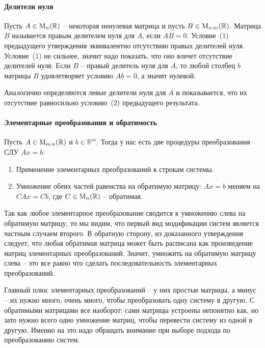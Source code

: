 \paragraph{Делители нуля}

Пусть $A\in\operatorname{M}_{n}(\mathbb R)$ -- некоторая ненулевая матрица и пусть $B\in\operatorname{M}_{n\,m}(\mathbb R)$.
Матрица $B$ называется правым делителем нуля для $A$, если $AB = 0$.
Условие~(1) предыдущего утверждения эквивалентно отсутствию правых делителей нуля.
Условие~(1) не сильнее, значит надо показать, что оно влечет отсутствие делителей нуля.
Если $B$ -- правый делитель нуля для $A$, то любой столбец $b$ матрицы $B$ удовлетворяет условию $Ab = 0$, а значит нулевой.

Аналогично определяются левые делители нуля для $A$ и показывается, что их отсутствие равносильно условию~(2) предыдущего результата.

\paragraph{Элементарные преобразования и обратимость}

Пусть $A\in\operatorname{M}_{m\,n}(\mathbb R)$ и $b\in\mathbb R^m$.
Тогда у нас есть две процедуры преобразования СЛУ $Ax = b$:
\begin{enumerate}
\item Применение элементарных преобразований к строкам системы.

\item Умножение обеих частей равенства на обратимую матрицу: $Ax=b$ меняем на $CAx = Cb$, где $C\in\operatorname{M}_{n}(\mathbb R)$ -- обратимая.
\end{enumerate}

Так как любое элементарное преобразование сводится к умножению слева на обратимую матрицу, то мы видим, что первый вид модификации систем является частным случаем второго.
В обратную сторону, из доказанного утверждения следует, что любая обратимая матрица может быть расписана как произведение матриц элементарных преобразований.
Значит, умножить на обратимую матрицу слева -- это все равно что сделать последовательность элементарных преобразований.

Главный плюс элементарных преобразований -- у них простые матрицы, а минус -- их нужно много, очень много, чтобы преобразовать одну систему в другую.
С обратимыми матрицами все наоборот: сами матрицы устроены непонятно как, но зато нужно всего одно умножение матриц, чтобы перевести систему из одной в другую.
Именно на это надо обращать внимание при выборе подхода по преобразованию систем.


